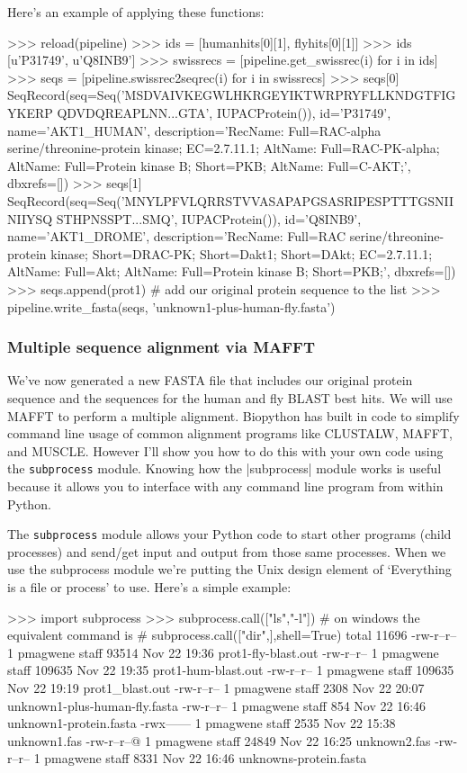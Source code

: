 \documentclass[10pt,letterpaper]{scrartcl}
\begin{document}
Here's an example of applying these functions:

\begin{python}
>>> reload(pipeline)
>>> ids = [humanhits[0][1], flyhits[0][1]]
>>> ids
[u'P31749', u'Q8INB9']
>>> swissrecs = [pipeline.get_swissrec(i) for i in ids]
>>> seqs = [pipeline.swissrec2seqrec(i) for i in swissrecs]
>>> seqs[0]
SeqRecord(seq=Seq('MSDVAIVKEGWLHKRGEYIKTWRPRYFLLKNDGTFIGYKERP
QDVDQREAPLNN...GTA', IUPACProtein()), id='P31749', name='AKT1_HUMAN', 
description='RecName: Full=RAC-alpha serine/threonine-protein kinase; 
EC=2.7.11.1; AltName: Full=RAC-PK-alpha; AltName: Full=Protein kinase B; 
Short=PKB; AltName: Full=C-AKT;', dbxrefs=[])
>>> seqs[1]
SeqRecord(seq=Seq('MNYLPFVLQRRSTVVASAPAPGSASRIPESPTTTGSNIINIIYSQ
STHPNSSPT...SMQ', IUPACProtein()), id='Q8INB9', name='AKT1_DROME', 
description='RecName: Full=RAC serine/threonine-protein kinase; Short=DRAC-PK; 
Short=Dakt1; Short=DAkt; EC=2.7.11.1; AltName: Full=Akt; AltName: Full=Protein 
kinase B; Short=PKB;', dbxrefs=[])
>>> seqs.append(prot1)  # add our original protein sequence to the list
>>> pipeline.write_fasta(seqs, 'unknown1-plus-human-fly.fasta')
\end{python}


\subsubsection*{Multiple sequence alignment via MAFFT}

We've now generated a new FASTA file that includes our original protein sequence and the sequences for the human and fly BLAST best hits.  We will use MAFFT to perform a multiple alignment. Biopython has built in code to simplify command line usage of common alignment programs like CLUSTALW, MAFFT, and MUSCLE.  However I'll show you how to do this with your own code using the \verb=subprocess= module.  Knowing how the |subprocess| module works is useful because it allows you to interface with any command line program from within Python.

The \verb=subprocess= module allows your Python code to start other programs (child processes) and send/get input and output from those same processes. When we use the subprocess module we're putting the Unix design element of `Everything is a file or process' to use. Here's a simple example:

\begin{python}
>>> import subprocess
>>> subprocess.call(["ls","-l"]) 
# on windows the equivalent command is
# subprocess.call(["dir",],shell=True)
total 11696
-rw-r--r--   1 pmagwene  staff    93514 Nov 22 19:36 prot1-fly-blast.out
-rw-r--r--   1 pmagwene  staff   109635 Nov 22 19:35 prot1-hum-blast.out
-rw-r--r--   1 pmagwene  staff   109635 Nov 22 19:19 prot1_blast.out
-rw-r--r--   1 pmagwene  staff     2308 Nov 22 20:07 unknown1-plus-human-fly.fasta
-rw-r--r--   1 pmagwene  staff      854 Nov 22 16:46 unknown1-protein.fasta
-rwx------   1 pmagwene  staff     2535 Nov 22 15:38 unknown1.fas
-rw-r--r--@  1 pmagwene  staff    24849 Nov 22 16:25 unknown2.fas
-rw-r--r--   1 pmagwene  staff     8331 Nov 22 16:46 unknowns-protein.fasta
\end{python}
\end{document}

